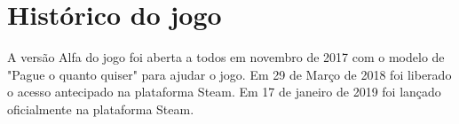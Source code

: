 \documentclass[12pt,oneside,a4paper,chapter=TITLE,section=TITLE,sumario
=tradicional]{abntex2}
\begin{document}
\chapter{Histórico do jogo}
\label{cap:historico-do-jogo}

A versão Alfa do jogo foi aberta a todos em novembro de 2017 com o modelo de "Pague o quanto quiser" para ajudar o jogo.
Em 29 de Março de 2018 foi liberado o acesso antecipado na plataforma Steam.
Em 17 de janeiro de 2019 foi lançado oficialmente na plataforma Steam.




\end{document}
